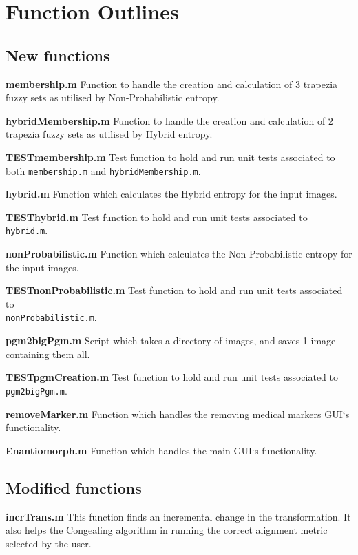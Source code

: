 \chapter{Function Outlines}
\label{appendix:code}

\section{New functions}

\noindent \textbf{membership.m}
Function to handle the creation and calculation of 3 trapezia fuzzy sets as utilised by Non-Probabilistic entropy.

\noindent \textbf{hybridMembership.m}
Function to handle the creation and calculation of 2 trapezia fuzzy sets as utilised by Hybrid entropy.

\noindent \textbf{TESTmembership.m}
Test function to hold and run unit tests associated to both \texttt{membership.m} and \texttt{hybridMembership.m}.

\noindent \textbf{hybrid.m}
Function which calculates the Hybrid entropy for the input images.

\noindent \textbf{TESThybrid.m}
Test function to hold and run unit tests associated to \texttt{hybrid.m}.

\noindent \textbf{nonProbabilistic.m}
Function which calculates the Non-Probabilistic entropy for the input images.

\noindent \textbf{TESTnonProbabilistic.m}
Test function to hold and run unit tests associated to \\ \texttt{nonProbabilistic.m}.

\noindent \textbf{pgm2bigPgm.m}
Script which takes a directory of images, and saves 1 image containing them all.

\noindent \textbf{TESTpgmCreation.m}
Test function to hold and run unit tests associated to \texttt{pgm2bigPgm.m}.

\noindent \textbf{removeMarker.m}
Function which handles the removing medical markers \acrshort{GUI}`s functionality.

\noindent \textbf{Enantiomorph.m}
Function which handles the main \acrshort{GUI}`s functionality.

\section{Modified functions}

\noindent \textbf{incrTrans.m}
This function finds an incremental change in the transformation. It also helps the \Gls{Congealing} algorithm in running the correct alignment metric selected by the user.

